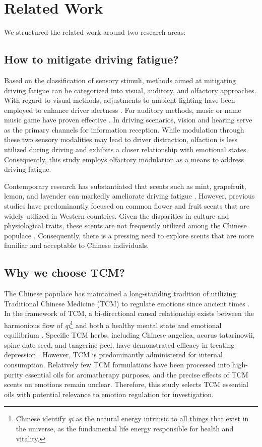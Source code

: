 \section{Related Work}
We structured the related work around two research areas:


\subsection{How to mitigate driving fatigue?}
Based on the classification of sensory stimuli, methods aimed at mitigating driving fatigue can be categorized into visual, auditory, and olfactory approaches. With regard to visual methods, adjustments to ambient lighting have been employed to enhance driver alertness \cite{li2021visual,qin2021characteristics,hassib2019detecting}. For auditory methods, music\cite{guo2024could,orsini2024music} or name music game\cite{trumbo2017name} have proven effective . In driving scenarios, vision and hearing serve as the primary channels for information reception. While modulation through these two sensory modalities may lead to driver distraction, olfaction is less utilized during driving and exhibits a closer relationship with emotional states\cite{alaoui1997basic}. Consequently, this study employs olfactory modulation as a means to address driving fatigue.

Contemporary research has substantiated that scents such as mint, grapefruit, lemon, and lavender can markedly ameliorate driving fatigue \cite{jiang2024scented,dahlman2024vehicle,yoshida2011study}. However, previous studies have predominantly focused on common flower and fruit scents that are widely utilized in Western countries. Given the disparities in culture and physiological traits, these scents are not frequently utilized among the Chinese populace \cite{yunjun2013perfume}. Consequently, there is a pressing need to explore scents that are more familiar and acceptable to Chinese individuals.

\subsection{Why we choose TCM?}
The Chinese populace has maintained a long-standing tradition of utilizing Traditional Chinese Medicine (TCM) to regulate emotions since ancient times \cite{farrar2020clinical}. In the framework of TCM, a bi-directional causal relationship exists between the harmonious flow of \textit{qi}\footnote[1]{Chinese identify \textit{qi} as the natural energy intrinsic to all things that exist in the universe, as the fundamental life energy responsible for health and vitality\cite{mccaffrey2003qigong}.} and both a healthy mental state and emotional equilibrium \cite{zhou2021conceptualization}. Specific TCM herbs, including Chinese angelica, acorus tatarinowii, spine date seed, and tangerine peel, have demonstrated efficacy in treating depression \cite{li2020traditional,zhang2019challenge,sun2022dissecting}.
However, TCM is predominantly administered for internal consumption. Relatively few TCM formulations have been processed into high-purity essential oils for aromatherapy purposes, and the precise effects of TCM scents on emotions remain unclear. Therefore, this study selects TCM essential oils with potential relevance to emotion regulation for investigation.
